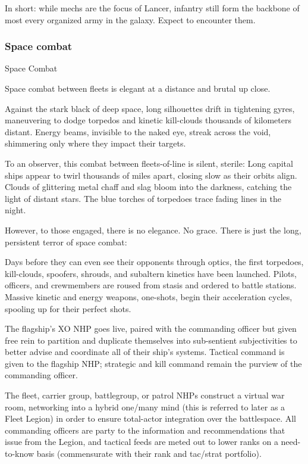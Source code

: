 In short: while mechs are the focus of Lancer, infantry still form the backbone of most every
organized army in the galaxy. Expect to encounter them.

\subsubsection{Space combat}
Space Combat

Space combat between fleets is elegant at a distance and brutal up close.


Against the stark black of deep space, long silhouettes drift in tightening gyres, maneuvering to
dodge torpedos and kinetic kill-clouds thousands of kilometers distant. Energy beams, invisible
to the naked eye, streak across the void, shimmering only where they impact their targets.


To an observer, this combat between fleets-of-line is silent, sterile: Long capital ships appear to
twirl thousands of miles apart, closing slow as their orbits align. Clouds of glittering metal chaff
and slag bloom into the darkness, catching the light of distant stars. The blue torches of
torpedoes trace fading lines in the night.





However, to those engaged, there is no elegance. No grace. There is just the long, persistent
terror of space combat:


Days before they can even see their opponents through optics, the first torpedoes, kill-clouds,
spoofers, shrouds, and subaltern kinetics have been launched. Pilots, officers, and
crewmembers are roused from stasis and ordered to battle stations. Massive kinetic and energy
weapons, one-shots, begin their acceleration cycles, spooling up for their perfect shots.


The flagship’s XO NHP goes live, paired with the commanding officer but given free rein to
partition and duplicate themselves into sub-sentient subjectivities to better advise and
coordinate all of their ship’s systems. Tactical command is given to the flagship NHP; strategic
and kill command remain the purview of the commanding officer.


The fleet, carrier group, battlegroup, or patrol NHPs construct a virtual war room, networking into
a hybrid one/many mind (this is referred to later as a Fleet Legion) in order to ensure total-actor
integration over the battlespace. All commanding officers are party to the information and
recommendations that issue from the Legion, and tactical feeds are meted out to lower ranks on
a need-to-know basis (commensurate with their rank and tac/strat portfolio).


